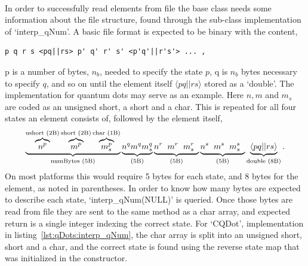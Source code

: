 \paragraph{}
In order to successfully read elements from file the base class needs some information about the file structure, found through the sub-class implementation of `interp\_qNum'.
A basic file format is expected to be binary with the content,
\begin{verbatim}
p q r s <pq||rs> p' q' r' s' <p'q'||r's'> ... ,
\end{verbatim}
p is a number of bytes, $n_{b}$, needed to specify the state $p$, q is $n_b$ bytes necessary to specify $q$, and so on until the element itself $\langle pq||rs \rangle$ stored as a `double'. 
The implementation for quantum dots may serve as an example.
Here $n,m$ and $m_s$ are coded as an unsigned short, a short and a char. 
This is repeated for all four states an element consists of, followed by the element itself,
\begin{equation}
\underbrace{
\overbrace{n^p}^\text{ushort (2B)} 
\overbrace{m^p}^\text{short (2B)}
\overbrace{m_s^p}^\text{char (1B)}
}_\text{numBytes (5B)}
\underbrace{n^q m^q m_s^q}_\text{(5B)}
\underbrace{n^r\hspace{2mm}m^r\hspace{2mm}m_s^r\hspace{2mm}}_\text{(5B)}
\underbrace{n^s\hspace{2mm}m^s\hspace{2mm}m_s^s\hspace{2mm}}_\text{(5B)}
\underbrace{\langle pq||rs \rangle}_\text{double (8B)} .
\end{equation}
On most platforms this would require 5 bytes for each state, and 8 bytes for the element, as noted in parentheses.
In order to know how many bytes are expected to describe each state, `interp\_qNum(NULL)' is queried.
Once those bytes are read from file they are sent to the same method as a char array, and expected return is a single integer indexing the correct state.
For `CQDot', implementation in listing~\ref{lst:qDots:interp_qNum}, the char array is split into an unsigned short, short and a char, and the correct state is found using the reverse state map that was initialized in the constructor.
